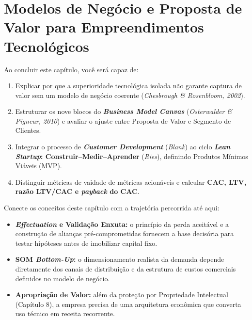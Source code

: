 \chapter{Modelos de Negócio e Proposta de Valor para Empreendimentos Tecnológicos}
\label{cap:09}

\noindent{}

\begin{capObjetivos}
  Ao concluir este capítulo, você será capaz de:
  \begin{enumerate}[leftmargin=1.5em, itemsep=2pt]
    \item Explicar por que a superioridade tecnológica isolada não garante captura de valor sem um modelo de negócio coerente (\textit{Chesbrough \& Rosenbloom, 2002}).
    \item Estruturar os nove blocos do \textbf{\textit{Business Model Canvas}} (\textit{Osterwalder \& Pigneur, 2010}) e avaliar o ajuste entre Proposta de Valor e Segmento de Clientes.
    \item Integrar o processo de \textbf{\textit{Customer Development}} (\textit{Blank}) ao ciclo \textbf{\textit{Lean Startup}: Construir–Medir–Aprender} (\textit{Ries}), definindo Produtos Mínimos Viáveis (MVP).
    \item Distinguir métricas de vaidade de métricas acionáveis e calcular \textbf{CAC, LTV, razão LTV/CAC e \textit{payback} do CAC}.
  \end{enumerate}
\end{capObjetivos}

\begin{capRevisao}
  Conecte os conceitos deste capítulo com a trajetória percorrida até aqui:
  \begin{itemize}[leftmargin=1.5em, itemsep=2pt]
    \item \textbf{\textit{Effectuation} e Validação Enxuta:} o princípio da perda aceitável e a construção de alianças pré-comprometidas fornecem a base decisória para testar hipóteses antes de imobilizar capital fixo.
    \item \textbf{SOM \textit{Bottom-Up}:} o dimensionamento realista da demanda depende diretamente dos canais de distribuição e da estrutura de custos comerciais definidos no modelo de negócio.
    \item \textbf{Apropriação de Valor:} além da proteção por Propriedade Intelectual (Capítulo 8), a empresa precisa de uma arquitetura econômica que converta uso técnico em receita recorrente.
  \end{itemize}
\end{capRevisao}

